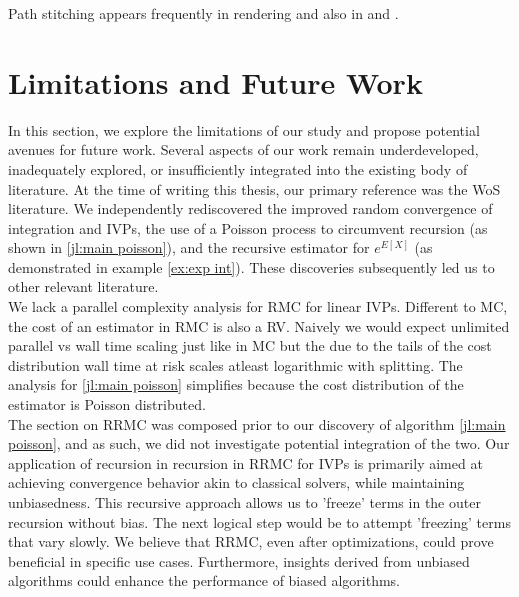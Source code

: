 \documentclass[a4paper,12pt]{article}
\begin{document}
\begin{related}
  Path stitching appears frequently in rendering and also in \cite{das_sarma_fast_2015}
  and \cite{ji_reusing_2012}.
\end{related}

\section{Limitations and Future Work}

In this section, we explore the limitations of our study and propose potential avenues for future work. 
Several aspects of our work remain underdeveloped, inadequately explored, or insufficiently integrated
into the existing body of literature. At the time of writing this thesis, our 
primary reference was the WoS literature. We independently rediscovered 
the improved random convergence of integration and IVPs, the 
use of a Poisson process to circumvent recursion (as shown in \ref{jl:main poisson}), 
and the recursive estimator for $e^{E[X]}$ (as demonstrated in example \ref{ex:exp int}). 
These discoveries subsequently led us to other relevant literature. \\

We lack a parallel complexity analysis for RMC for linear IVPs. Different to MC, the cost of an estimator in RMC
is also a RV. Naively we would expect unlimited parallel vs wall time scaling  just like in MC but the due
to the tails of the cost distribution wall time at risk scales atleast logarithmic with splitting. The analysis
for \ref{jl:main poisson} simplifies because the cost distribution of the estimator is Poisson distributed.\\

The section on RRMC was composed prior to our discovery of algorithm \ref{jl:main poisson}, 
and as such, we did not investigate potential integration of the two. Our application of 
recursion in recursion in RRMC for IVPs is primarily aimed at achieving convergence behavior 
akin to classical solvers, while maintaining unbiasedness. This recursive approach allows us to 
'freeze' terms in the outer recursion without bias. The next logical step would be 
to attempt 'freezing' terms that vary slowly. We believe that RRMC, even after optimizations, could
prove beneficial in specific use cases. Furthermore, insights derived from unbiased algorithms could
enhance the performance of biased algorithms. \\
\end{document}
